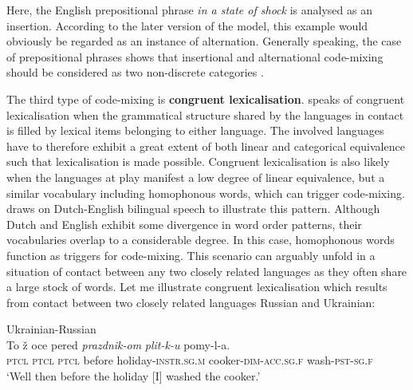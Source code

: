 \noindent Here, the English prepositional phrase \textit{in a state of shock} is analysed as an insertion. According to the later version of the model, this example would obviously be regarded as an instance of alternation. Generally speaking, the case of prepositional phrases shows that insertional and alternational code-mixing should be considered as two non-discrete categories \citep[cf.][95]{backus-two-1996}.

The third type of code-mixing is \textbf{congruent lexicalisation}. \citet[3--4]{muysken-bilingual-2000} speaks of congruent lexicalisation when the grammatical structure shared by the languages in contact is filled by lexical items belonging to either language. The involved languages have to therefore exhibit a great extent of both linear and categorical equivalence such that lexicalisation is made possible. Congruent lexicalisation is also likely when the languages at play manifest a low degree of linear equivalence, but a similar vocabulary including homophonous words, which can trigger code-mixing. \citet[][123]{muysken-bilingual-2000} draws on Dutch-English bilingual speech to illustrate this pattern. Although Dutch and English exhibit some divergence in word order patterns, their vocabularies overlap to a considerable degree. In this case, homophonous words function as triggers for code-mixing. This scenario can arguably unfold in a situation of contact between any two closely related languages as they often share a large stock of words. Let me illustrate congruent lexicalisation which results from contact between two closely related languages Russian and Ukrainian:

\ea{\label{ex:1:6}}
Ukrainian-Russian \citep{vahtin-novye-2003}\\
\gll To ž oce pered \textit{prazdnik-om} \textit{plit-k-u} pomy-l-a.\\
	\textsc{ptcl} \textsc{ptcl} \textsc{ptcl} before holiday-\textsc{instr.sg.m} cooker-\textsc{dim}-\textsc{acc.sg.f} wash-\textsc{pst-sg.f}\\
\glt `Well then before the holiday [I] washed the cooker.' 
\z


